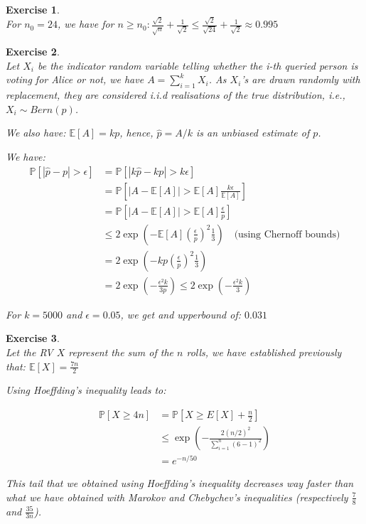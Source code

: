 \documentclass{article}
\newtheorem{exo}{Exercise}
\def\P{\mathbb{P}}
\def\E{\mathbb{E}}
\begin{document}
\begin{exo}{\ \\}
For $n_0  = 24$, we have for 
$n \geq n_0: 
\frac{\sqrt{2}}{\sqrt{n}} + \frac{1}{\sqrt{2}} 
\leq \frac{\sqrt{2}}{\sqrt{24}} + \frac{1}{\sqrt{2}} 
\approx 0.995 $

\end{exo}

\begin{exo}{\ \\}
    Let $X_i$ be the indicator random variable telling whether the i-th queried person is voting for Alice or not, we have $A = \sum^{k}_{i=1}  X_i$. As $X_i$'s are drawn randomly with replacement, 
    they are considered i.i.d realisations of the true distribution, i.e., $X_i \sim Bern(p) $.

We also have: $\E[A] = kp$, hence, $\hat{p} = A/k$ is an unbiased estimate of $p$.

We have:
\begin{align*}
    \P[|\hat{p}-p|>\epsilon]
    &= \P[|k\hat{p}-kp|>k\epsilon] \\
    &= \P\left[|A - \E[A]| > \E[A] \frac{k \epsilon}{\E[A]} \right] \\
    &= \P\left[|A - \E[A]| > \E[A] \frac{\epsilon}{p} \right] \\
    &\leq 2 \exp{\left(-\E[A] \left(\frac{\epsilon}{p}\right)^2 \frac{1}{3}\right)}
    \quad \text{(using Chernoff bounds)} \\
    &= 2 \exp{\left(- k p   \left(\frac{\epsilon}{p}\right)^2 \frac{1}{3}\right)} \\
    &= 2 \exp{\left(-\frac{\epsilon^2 k}{3p}\right)}
    \leq  2 \exp{\left(-\frac{\epsilon^2 k}{3}\right)}
\end{align*}

For $k = 5000$ and $\epsilon = 0.05$, we get and upperbound of: $0.031$ \\



\end{exo}

\begin{exo}{\ \\}
Let the RV $X$ represent the sum of the $n$ rolls, we have established previously that: $\E[X] = \frac{7n}{2}$


Using Hoeffding's inequality leads to:

\begin{align*}
    \P[X \geq 4n] 
    &= \P[X \geq E[X]+ \frac{n}{2} ] \\
    &\leq \exp{\left(-\frac{2 (n/2)^2}{\sum^{n}_{i=1} (6-1)^2}\right)} \\
    &= e^{-n/50} 
\end{align*}

This tail that we obtained using Hoeffding's inequality decreases way faster than what we have obtained with Marokov and Chebychev's inequalities (respectively $\frac{7}{8}$ and $\frac{35}{3n}$).

\end{exo}
\end{document}
